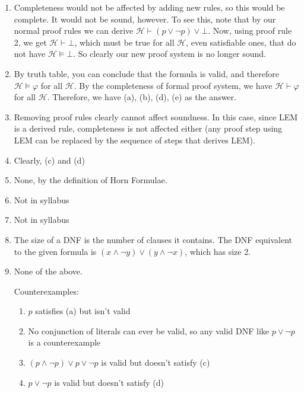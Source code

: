\documentclass{article}
\begin{document}
\begin{enumerate}
    \item Completeness would not be affected by adding new rules, so this would be complete. It would not be sound, however. To see this, note that by our normal proof rules we can derive $\mathcal{H} \vdash (p \lor \neg p) \lor \bot$. Now, using proof rule 2, we get $\mathcal{H} \vdash \bot$, which must be true for all $\mathcal{H}$, even satisfiable ones, that do not have $\mathcal{H} \vDash \bot$. So clearly our new proof system is no longer sound.
    \item By truth table, you can conclude that the formula is valid, and therefore $\mathcal{H} \vDash \varphi$ for all $\mathcal{H}$. By the completeness of formal proof system, we have $\mathcal{H} \vdash \varphi$ for all $\mathcal{H}$. Therefore, we have (a), (b), (d), (e) as the answer.
    \item Removing proof rules clearly cannot affect soundness. In this case, since LEM is a derived rule, completeness is not affected either (any proof step using LEM can be replaced by the sequence of steps that derives LEM).
    \item Clearly, (c) and (d)
    \item None, by the definition of Horn Formulae.
    \item Not in syllabus
    \item Not in syllabus
    \item The size of a DNF is the number of clauses it contains. The DNF equivalent to the given formula is $(x \land \neg y) \lor (y \land \neg x)$, which has size 2.
    \item None of the above.

    Counterexamples:\begin{enumerate}
        \item $p$ satisfies (a) but isn't valid
        \item No conjunction of literals can ever be valid, so any valid DNF like $p \lor \neg p$ is a counterexample 
        \item $(p \land \neg p) \lor p \lor \neg p$ is valid but doesn't satisfy (c)
        \item $p \lor \neg p$ is valid but doesn't satisfy (d)
    \end{enumerate}
\end{enumerate}
\end{document}
